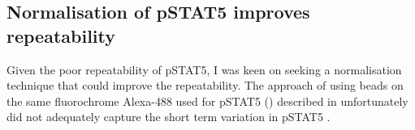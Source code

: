 %

\subsection{Normalisation of pSTAT5 improves repeatability}



Given the poor repeatability of pSTAT5, I was keen on seeking a normalisation technique that could improve the repeatability.
The approach of using beads on the same fluorochrome Alexa-488 used for pSTAT5 () described in 
unfortunately did not adequately capture the short term variation in pSTAT5 .

